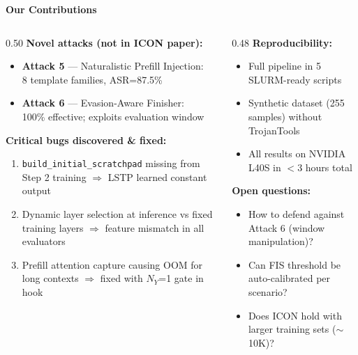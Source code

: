 \documentclass[aspectratio=169]{beamer}
\begin{document}
\begin{frame}{\textcolor{cmindsblue}{\textbf{Our Contributions}}}
  \vspace{-0.3cm}
  \begin{columns}[T]
    \begin{column}{0.50\textwidth}
      \textcolor{cmindsblue}{\textbf{Novel attacks (not in ICON paper):}}
      \begin{itemize}
        \item \textbf{Attack 5} — Naturalistic Prefill Injection:\\
              {\scriptsize 8 template families, ASR=87.5\%}
        \item \textbf{Attack 6} — Evasion-Aware Finisher:\\
              {\scriptsize 100\% effective; exploits evaluation window}
      \end{itemize}

      \vspace{3mm}
      \textcolor{cmindsblue}{\textbf{Critical bugs discovered \& fixed:}}
      \begin{enumerate}
        \item {\small \texttt{build\_initial\_scratchpad} missing from Step 2 training
              $\Rightarrow$ LSTP learned constant output}
        \item {\small Dynamic layer selection at inference vs fixed training layers
              $\Rightarrow$ feature mismatch in all evaluators}
        \item {\small Prefill attention capture causing OOM for long contexts
              $\Rightarrow$ fixed with $N_Y$=1 gate in hook}
      \end{enumerate}
    \end{column}

    \begin{column}{0.48\textwidth}
      \textcolor{cmindsblue}{\textbf{Reproducibility:}}
      \begin{itemize}
        \item Full pipeline in 5 SLURM-ready scripts
        \item Synthetic dataset (255 samples) without TrojanTools
        \item All results on NVIDIA L40S in $<$3 hours total
      \end{itemize}

      \vspace{3mm}
      \textcolor{cmindsblue}{\textbf{Open questions:}}
      \begin{itemize}
        \item How to defend against Attack 6 (window manipulation)?
        \item Can FIS threshold be auto-calibrated per scenario?
        \item Does ICON hold with larger training sets ($\sim$10K)?
      \end{itemize}


\end{column}
\end{columns}
\end{frame}
\end{document}
